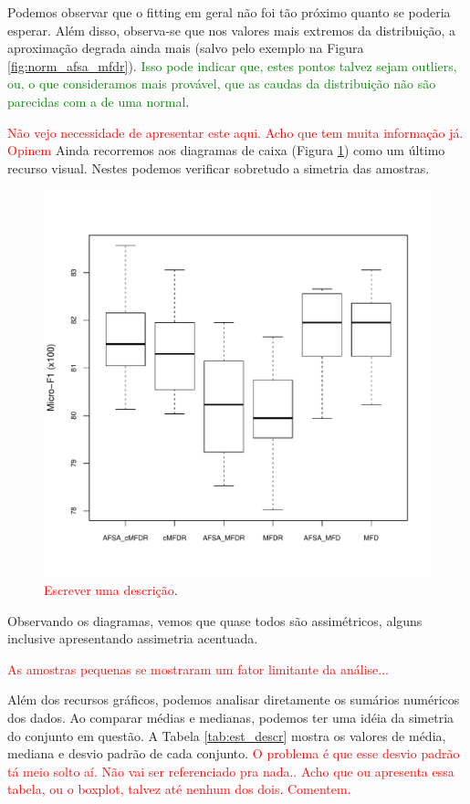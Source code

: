 \documentclass[conference]{IEEEtran}
\begin{document}
Podemos observar que o fitting em geral não foi tão próximo quanto se poderia esperar.
Além disso, observa-se que nos valores mais extremos da distribuição, a aproximação degrada ainda mais (salvo pelo exemplo na Figura \ref{fig:norm_afsa_mfdr}).
\textcolor{green}{Isso pode indicar que, estes pontos talvez sejam outliers, ou, o que consideramos mais provável, que as caudas da distribuição não são parecidas com a de uma normal}.

\textcolor{red}{Não vejo necessidade de apresentar este aqui. Acho que tem muita informação já. Opinem}
Ainda recorremos aos diagramas de caixa (Figura \ref{fig:boxplot}) como um último recurso visual. 
Nestes podemos verificar sobretudo a simetria das amostras.

\begin{figure}[h]
	\centering
	\includegraphics[width=\linewidth]{img/blueboxplot.pdf}
	\caption{\textcolor{red}{Escrever uma descrição}.}
	\label{fig:boxplot}
\end{figure}

Observando os diagramas, vemos que quase todos são assimétricos, alguns inclusive apresentando assimetria acentuada.

\textcolor{red}{As amostras pequenas se mostraram um fator limitante da análise...}

Além dos recursos gráficos, podemos analisar diretamente os sumários numéricos dos dados.
Ao comparar médias e medianas, podemos ter uma idéia da simetria do conjunto em questão.
A Tabela \ref{tab:est_descr} mostra os valores de média, mediana e desvio padrão de cada conjunto.
\textcolor{red} {O problema é que esse desvio padrão tá meio solto aí. Não vai ser referenciado pra nada.. Acho que ou apresenta essa tabela, ou o boxplot, talvez até nenhum dos dois. Comentem.}
\end{document}
